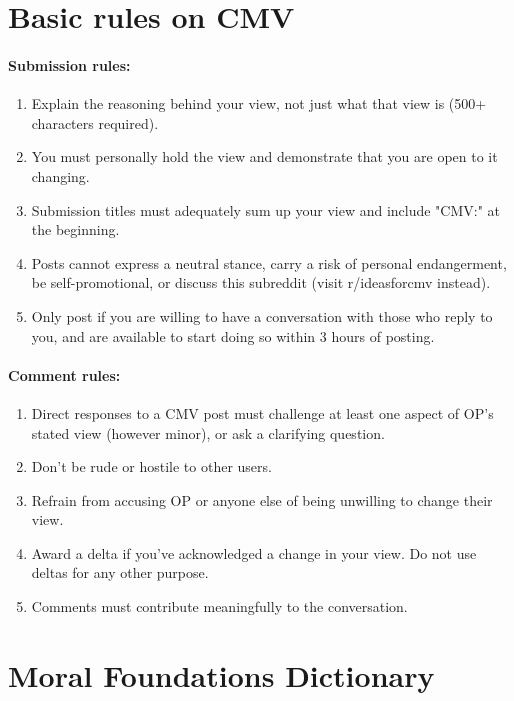 

\section{Basic rules on CMV}

\paragraph{Submission rules:}
\begin{enumerate}[A]\singlespacing
\item Explain the reasoning behind your view, not just what that view is (500+ characters required).
\item You must personally hold the view and demonstrate that you are open to it changing.
\item Submission titles must adequately sum up your view and include "CMV:" at the beginning.
\item Posts cannot express a neutral stance, carry a risk of personal endangerment, be self-promotional, or discuss this subreddit (visit r/ideasforcmv instead).
\item Only post if you are willing to have a conversation with those who reply to you, and are available to start doing so within 3 hours of posting.
\end{enumerate}

\paragraph{Comment rules:}
\begin{enumerate}[1]\singlespacing
\item Direct responses to a CMV post must challenge at least one aspect of OP’s stated view (however minor), or ask a clarifying question.
\item Don't be rude or hostile to other users.
\item Refrain from accusing OP or anyone else of being unwilling to change their view.
\item Award a delta if you've acknowledged a change in your view. Do not use deltas for any other purpose.
\item Comments must contribute meaningfully to the conversation.
\end{enumerate}


\clearpage
\section{Moral Foundations Dictionary}

